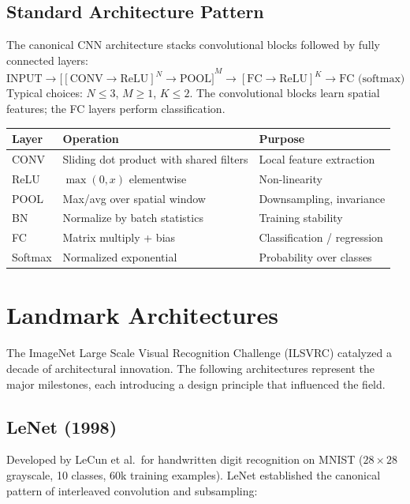 \documentclass[11pt,a4paper]{article}
\theoremstyle{definition}
\theoremstyle{plain}
\theoremstyle{remark}
\begin{document}
\subsection{Standard Architecture Pattern}

The canonical CNN architecture stacks convolutional blocks followed by fully connected layers:
\[
    \text{INPUT} \to {\bigl[{[\text{CONV} \to \text{ReLU}]}^{N} \to \text{POOL}\bigr]}^{M} \to {[\text{FC} \to \text{ReLU}]}^{K} \to \text{FC (softmax)}
\]
Typical choices: $N \leq 3$, $M \geq 1$, $K \leq 2$. The convolutional blocks learn spatial features; the FC layers perform classification.

\begin{tcolorbox}[colback=blue!5!white,colframe=blue!75!black,title=\textbf{Summary: CNN Layers}]
\begin{tabular}{lll}
    \textbf{Layer} & \textbf{Operation} & \textbf{Purpose} \\
    \hline
    CONV   & Sliding dot product with shared filters & Local feature extraction \\
    ReLU   & $\max(0, x)$ elementwise & Non-linearity \\
    POOL   & Max/avg over spatial window & Downsampling, invariance \\
    BN     & Normalize by batch statistics & Training stability \\
    FC     & Matrix multiply + bias & Classification / regression \\
    Softmax & Normalized exponential & Probability over classes \\
\end{tabular}
\end{tcolorbox}


\section{Landmark Architectures}

The ImageNet Large Scale Visual Recognition Challenge (ILSVRC) catalyzed a decade of architectural innovation. The following architectures represent the major milestones, each introducing a design principle that influenced the field.

\subsection{LeNet (1998)}

Developed by LeCun et al.\ for handwritten digit recognition on MNIST ($28 \times 28$ grayscale, 10 classes, 60k training examples). LeNet established the canonical pattern of interleaved convolution and subsampling:
\end{document}
